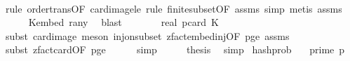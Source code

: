 \begin{isabellebody}
\ \ \ \ \ \isamarkupfalse%
\ {\isacharparenleft}{\kern0pt}rule\ order{\isacharunderscore}{\kern0pt}trans{\isacharbrackleft}{\kern0pt}OF\ card{\isacharunderscore}{\kern0pt}image{\isacharunderscore}{\kern0pt}le{\isacharbrackright}{\kern0pt}{\isacharcomma}{\kern0pt}\ rule\ finite{\isacharunderscore}{\kern0pt}subset{\isacharbrackleft}{\kern0pt}OF\ assms{\isacharparenleft}{\kern0pt}{}{\isacharparenright}{\kern0pt}{\isacharbrackright}{\kern0pt}{\isacharcomma}{\kern0pt}\ simp{\isacharcomma}{\kern0pt}\ metis\ assms{\isacharparenleft}{\kern0pt}{}{\isacharparenright}{\kern0pt}{\isacharparenright}{\kern0pt}\isanewline
\ \ \ \ \isamarkupfalse%
\ K{\isacharunderscore}{\kern0pt}embed\ ran{\isacharunderscore}{\kern0pt}y{\isacharprime}{\kern0pt}\ \isamarkupfalse%
\ blast\isanewline
\ \ \isamarkupfalse%
\ \isamarkupfalse%
\ {\isachardoublequoteopen}{\isachardot}{\kern0pt}{\isachardot}{\kern0pt}{\isachardot}{\kern0pt}\ {\isacharequal}{\kern0pt}\ {}{\isacharslash}{\kern0pt}real\ p{\isacharcircum}{\kern0pt}{\isacharparenleft}{\kern0pt}card\ K{\isacharparenright}{\kern0pt}{\isachardoublequoteclose}\ \isanewline
\ \ \ \ \isamarkupfalse%
\ {\isacharparenleft}{\kern0pt}subst\ card{\isacharunderscore}{\kern0pt}image{\isacharcomma}{\kern0pt}\ meson\ inj{\isacharunderscore}{\kern0pt}on{\isacharunderscore}{\kern0pt}subset\ zfact{\isacharunderscore}{\kern0pt}embed{\isacharunderscore}{\kern0pt}inj{\isacharbrackleft}{\kern0pt}OF\ p{\isacharunderscore}{\kern0pt}ge{\isacharunderscore}{\kern0pt}{}{\isacharbrackright}{\kern0pt}\ assms{\isacharparenleft}{\kern0pt}{}{\isacharparenright}{\kern0pt}{\isacharparenright}{\kern0pt}\isanewline
\ \ \ \ \isamarkupfalse%
\ {\isacharparenleft}{\kern0pt}subst\ zfact{\isacharunderscore}{\kern0pt}card{\isacharbrackleft}{\kern0pt}OF\ p{\isacharunderscore}{\kern0pt}ge{\isacharunderscore}{\kern0pt}{}{\isacharbrackright}{\kern0pt}{\isacharparenright}{\kern0pt}\isanewline
\ \ \ \ \isamarkupfalse%
\ simp\isanewline
\ \ \isamarkupfalse%
\ \isamarkupfalse%
\ {\isacharquery}{\kern0pt}thesis\ \isamarkupfalse%
\ simp\isanewline
{}\isamarkupfalse%
%
\endisatagproof
{\isafoldproof}%
%
\isadelimproof
\isanewline
%
\endisadelimproof
\isanewline
{}\isamarkupfalse%
\ hash{\isacharunderscore}{\kern0pt}prob{\isacharunderscore}{\kern0pt}{}{\isacharcolon}{\kern0pt}\isanewline
\ \ \ {\isachardoublequoteopen}prime\ p{\isachardoublequoteclose}\isanewline

\end{isabellebody}
